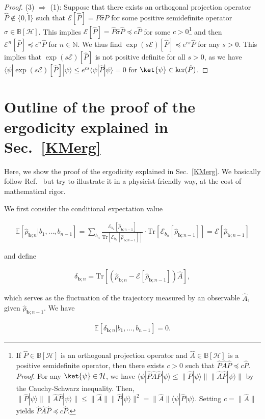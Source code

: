 \documentclass[preprint,pteplogo]{ptephy_v2}%
\numberwithin{equation}{section}
\theoremstyle{definition}
\newcommand{\mc}[1]{\mathcal{#1}}
\newcommand{\ml}[1]{\mathcal{#1}}
\newcommand{\mr}[1]{\mathrm{#1}}
\newcommand{\mbb}[1]{\mathbb{#1}}
\newcommand{\lrs}[1]{\left( #1 \right)}
\newcommand{\lrl}[1]{\left[ #1 \right]}
\newcommand{\aln}[1]{
\begin{align}
#1
\end{align}
}
\newcommand{\Tr}{\mr{Tr}}
\begin{document}
\begin{proof}
(3) $\Rightarrow$ (1): 
Suppose that there exists an orthogonal projection operator $\hat{P} \notin \{ 0, \hat{\mbb{I}} \}$ such that $\mc{E}[\hat{P}] = \hat{P} \hat{\sigma} \hat{P}$ for some positive semidefinite operator $\hat{\sigma} \in \mbb{B}[\mc{H}]$.
This implies $\mc{E}[\hat{P}] = \hat{P} \hat{\sigma} \hat{P}\preceq c \hat{P}$ for some $c>0$\footnote{
If $\hat{P} \in \mbb{B}[\mc{H}]$ is an orthogonal projection operator and $\hat{A} \in \mbb{B}[\mc{H}]$ is a positive semidefinite operator, then there exists $c>0$ such that $\hat{P} \hat{A} \hat{P} \preceq c \hat{P}$.
\textit{Proof}. For any $\ket{\psi} \in \mc{H}$, we have $\langle \psi | \hat{P} \hat{A} \hat{P} | \psi \rangle \leq \| \hat{P} |\psi \rangle \| \| \hat{A} \hat{P} |\psi \rangle \|$ by the Cauchy-Schwarz inequality. 
Then, $\| \hat{P} |\psi \rangle \| \| \hat{A} \hat{P} |\psi \rangle \| \leq \| \hat{A} \| \| \hat{P} |\psi \rangle \|^2 = \| \hat{A} \| \langle \psi | \hat{P} | \psi \rangle$. 
Setting $c=\| \hat{A} \|$ yields $\hat{P} \hat{A} \hat{P} \preceq c\hat{P}$.
}
and then $\mc{E}^n[\hat{P}] \preceq c^n \hat{P}$ for $n \in \mbb{N}$. 
We thus find $\exp(s\mc{E})[\hat{P}] \preceq e^{cs} \hat{P}$ for any $s > 0$.
This implies that $\exp(s\mc{E})[\hat{P}]$ is not positive definite for all $s>0$, as we have $\langle \psi | \exp(s\mc{E})[\hat{P}] | \psi \rangle \leq e^{cs} \langle \psi | \hat{P} | \psi \rangle = 0$ for $\ket{\psi} \in \textrm{ker}(\hat{P})$.
\end{proof}

\section{Outline of the proof of the ergodicity explained in Sec.~\ref{KMerg}} 
\label{app:erg}
Here, we show the proof of the ergodicity explained in Sec.~\ref{KMerg}.
We basically follow Ref.~\cite{kummerer2005quantum} but try to illustrate it in a physicist-friendly way, at the cost of mathematical rigor.

We first consider the conditional expectation value
\aln{\label{juyou}
\mbb{E}\lrl{\hat{\rho}_{\bm{b};n}|b_1,\ldots,b_{n-1}}=\sum_{b_{n}}\frac{\ml{E}_{b_{n}}[\hat{\rho}_{\bm{b};n-1}]}{\Tr[\ml{E}_{b_{n}}[\hat{\rho}_{\bm{b};n-1}]]}\cdot \Tr[\ml{E}_{b_{n}}[\hat{\rho}_{\bm{b};n-1}]]=\ml{E}[\hat{\rho}_{\bm{b};n-1}]
}
and define
\aln{
\delta_{\bm{b};n}=\Tr\lrl{\lrs{\hat{\rho}_{\bm{b};n}-\ml{E}[\hat{\rho}_{\bm{b};n-1}]}\hat{A}},
}
which serves as the fluctuation of the trajectory measured by an observable $\hat{A}$, given $\hat{\rho}_{\bm{b};n-1}$.
We have
\aln{
\mbb{E}[\delta_{\bm{b};n}|b_1,\ldots,b_{n-1}]=0.
}
\end{document}
